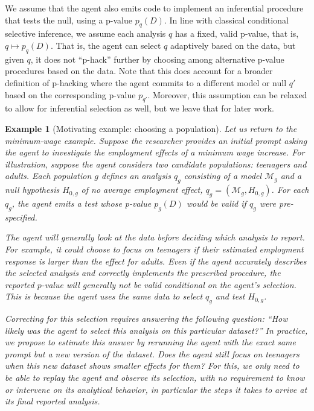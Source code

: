 \documentclass[10pt]{article}
\newtheorem{example}{Example}
\begin{document}
We assume that the agent also emits code to implement an inferential procedure that tests the null, using a p-value $p_q(D)$. In line with classical conditional selective inference, we assume each analysis $q$ has a fixed, valid p-value, that is, $q \mapsto p_q(D)$. That is, the agent can select $q$ adaptively based on the data, but given $q$, it does not ``p-hack'' further by choosing among alternative p-value procedures based on the data. Note that this does account for a broader definition of p-hacking where the agent commits to a different model or null $q'$ based on the corresponding p-value $p_{q'}$. Moreover, this assumption can be relaxed to allow for inferential selection as well, but we leave that for later work.

\begin{example}[Motivating example: choosing a population]\label{ex:motiv_example}
Let us return to the minimum-wage example. Suppose the researcher provides an initial prompt asking the agent to investigate the employment effects of a minimum wage increase. For illustration, suppose the agent considers two candidate populations: teenagers and adults. Each population $g$ defines an analysis $q_g$ consisting of a model $\mathcal M_g$ and a null hypothesis $H_{0,g}$ of no average employment effect, $q_g=(\mathcal M_g,H_{0,g})$. For each $q_g$, the agent emits a test whose p-value $p_g(D)$ would be valid if $q_g$ were pre-specified.

The agent will generally look at the data before deciding which analysis to report. For example, it could choose to focus on teenagers if their estimated employment response is larger than the effect for adults. Even if the agent accurately describes the selected analysis and correctly implements the prescribed procedure, the reported $p$-value will generally not be valid conditional on the agent's selection. This is because the agent uses the same data to select $q_g$ and test $H_{0,g}$.

Correcting for this selection requires answering the following question: ``How likely was the agent to select this analysis on this particular dataset?'' In practice, we propose to estimate this answer by rerunning the agent with the exact same prompt but a new version of the dataset. Does the agent still focus on teenagers when this new dataset shows smaller effects for them? For this, we only need to be able to \textit{replay} the agent and observe its selection, with no requirement to know or intervene on its analytical behavior, in particular the steps it takes to arrive at its final reported analysis.
\end{example}
\end{document}
